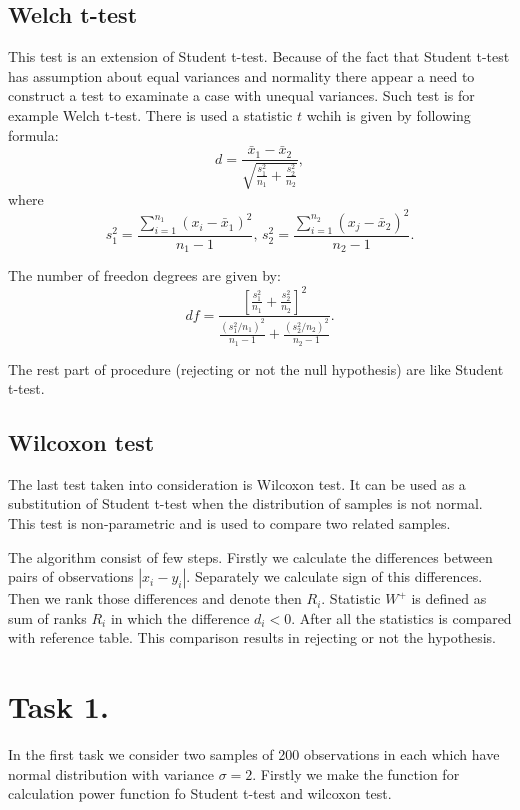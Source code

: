 \documentclass{article}
\begin{document}
  \subsection{Welch t-test}
This test is an extension of Student t-test. Because of the fact that Student t-test has assumption about equal variances and normality there appear a need to construct a test to examinate a case with unequal variances. Such test is for example Welch t-test. There is used a statistic $t$ wchih is given by following formula:
  \begin{equation}
     d=\dfrac{\bar{x}_1-\bar{x}_2}{\sqrt{\frac{s_1^2}{n_1}+\frac{s_2^2}{n_2}}},
  \end{equation}
where 
  \begin{equation}
     s_1^2=\dfrac{\sum\limits_{i=1}^{n_1}(x_i-\bar{x}_1)^2}{n_1-1},\, s_2^2=\dfrac{\sum\limits_{i=1}^{n_2}(x_j-\bar{x}_2)^2}{n_2-1}.
  \end{equation}

The number of freedon degrees are given by:
  \begin{equation}
     df=\dfrac{\left[\frac{s_1^2}{n_1}+\frac{s_2^2}{n_2}\right]^2}{\frac{(s_1^2/n_1)^2}{n_1-1}+\frac{(s_2^2/n_2)^2}{n_2-1}}.
  \end{equation}
  
The rest part of procedure (rejecting or not the null hypothesis) are like Student t-test.

  \subsection{Wilcoxon test}
The last test taken into consideration is Wilcoxon test. It can be used as a substitution of Student t-test when the distribution of samples is not normal. This test is non-parametric and is used to compare two related samples.

  The algorithm consist of few steps. Firstly we calculate the differences between pairs of observations $|x_i-y_i|$. Separately we calculate sign of this differences. Then we rank those differences and denote then $R_i$. Statistic $W^+$ is defined as sum of ranks $R_i$ in which the difference $d_i<0$. After all the statistics is compared with reference table. This comparison results in rejecting or not the hypothesis.


  \section{Task 1.}
In the first task we consider two samples of 200 observations in each which have normal distribution with variance $\sigma=2$.
  Firstly we make the function for calculation power function fo Student t-test and wilcoxon test.
 
\end{document}
